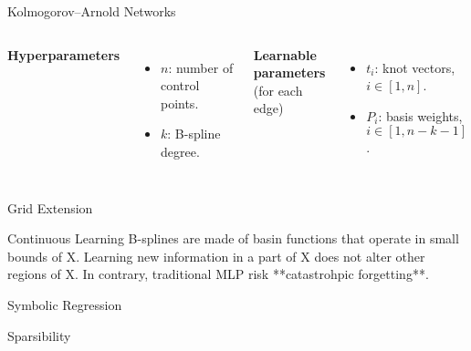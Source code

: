 \documentclass[aspectratio=169]{beamer}
\begin{document}
\begin{frame}{Kolmogorov–Arnold Networks}
	
	\begin{columns}[T,onlytextwidth]
		
		\centering
		\resizebox{\linewidth}{!}{}
		
		
		\textbf{Hyperparameters}
		\begin{itemize}
			\item $n$: number of control points.
			\item $k$: B-spline degree.
		\end{itemize}
		
		\vspace{0.8em}
		\textbf{Learnable parameters}\\(for each edge)
		\begin{itemize}
			\item $t_i$: knot vectors, $i \in [1, n]$.
			\item $P_i$: basis weights, $i \in [1, n-k-1]$.
		\end{itemize}
		
	\end{columns}
	
\end{frame}


\begin{frame}{Grid Extension}

\end{frame}


\begin{frame}{Continuous Learning}
B-splines are made of basin functions that operate in small bounds of X. Learning new information in a part of X does not alter other regions of X. In contrary, traditional MLP risk **catastrohpic forgetting**.
\end{frame}


\begin{frame}{Symbolic Regression}

\end{frame}


\begin{frame}{Sparsibility}

\end{frame}
\end{document}
